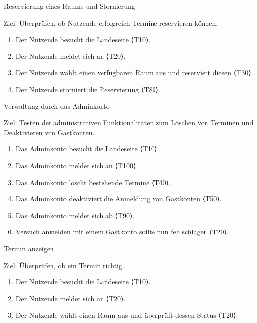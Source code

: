 \pagebreak

\begin{scenario}{20}{Reservierung eines Raums und Stornierung}
  \item[Ziel:] Überprüfen, ob Nutzende erfolgreich Termine reservieren können.
  \begin{enumerate}
    \item Der Nutzende besucht die Landeseite ⟨T10⟩.
    \item Der Nutzende meldet sich an ⟨T20⟩.
    \item Der Nutzende wählt einen verfügbaren Raum aus und reserviert diesen ⟨T30⟩.
    \item Der Nutzende storniert die Reservierung ⟨T80⟩.
  \end{enumerate}
\end{scenario}

\begin{scenario}{30}{Verwaltung durch das Adminkonto}
  \item[Ziel:] Testen der administrativen Funktionalitäten zum Löschen von Terminen und Deaktivieren von Gastkonten.
  \begin{enumerate}
    \item Das Adminkonto besucht die Landeseite ⟨T10⟩.
    \item Das Adminkonto meldet sich an ⟨T100⟩.
    \item Das Adminkonto löscht bestehende Termine ⟨T40⟩.
    \item Das Adminkonto deaktiviert die Anmeldung von Gastkonten ⟨T50⟩.
    \item Das Adminkonto meldet sich ab ⟨T90⟩.
    \item Versuch anmelden mit einem Gastkonto sollte nun fehlschlagen ⟨T20⟩.
  \end{enumerate}
\end{scenario}

\begin{scenario}{40}{Termin anzeigen}
  \item[Ziel:] Überprüfen, ob ein Termin richtig.
  \begin{enumerate}
    \item Der Nutzende besucht die Landeseite ⟨T10⟩.
    \item Der Nutzende meldet sich an ⟨T20⟩.
    \item Der Nutzende wählt einen Raum aus und überprüft dessen Status ⟨T20⟩.
  \end{enumerate}
\end{scenario}

